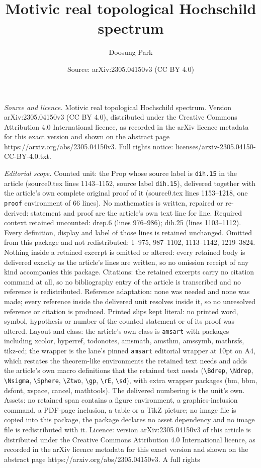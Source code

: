 \documentclass[10pt,a4paper]{amsart}
\title[Motivic real topological Hochschild spectrum]{Motivic real topological Hochschild spectrum}
\author{Doosung Park}
\date{Source: arXiv:2305.04150v3 (CC BY 4.0)}
\begin{document}
\maketitle

\noindent\emph{Source and licence.} Motivic real topological Hochschild spectrum. Version arXiv:2305.04150v3 (CC BY 4.0), distributed under the Creative Commons Attribution 4.0 International licence, as recorded in the arXiv licence metadata for this exact version and shown on the abstract page https://arxiv.org/abs/2305.04150v3. Full rights notice: licenses/arxiv-2305.04150-CC-BY-4.0.txt.\par\smallskip

\noindent\textit{Editorial scope.} Counted unit: the Prop whose source label is \texttt{dih.15} in the article (source0.tex lines 1143--1152, source label \texttt{dih.15}), delivered together with the article's own complete original proof of it (source0.tex lines 1153--1218, one \texttt{proof} environment of 66 lines). No mathematics is written, repaired or re-derived: statement and proof are the article's own text line for line. Required context retained uncounted: drep.6 (lines 976--986); dih.25 (lines 1103--1112). Every definition, display and label of those lines is retained unchanged. Omitted from this package and not redistributed: 1--975, 987--1102, 1113--1142, 1219--3824. Nothing inside a retained excerpt is omitted or altered: every retained body is delivered exactly as the article's lines are written, so no omission receipt of any kind accompanies this package. Citations: the retained excerpts carry no citation command at all, so no bibliography entry of the article is transcribed and no reference is redistributed. Reference adaptation: none was needed and none was made; every reference inside the delivered unit resolves inside it, so no unresolved reference or citation is produced. Printed slips kept literal: no printed word, symbol, hypothesis or number of the counted statement or of its proof was altered. Layout and class: the article's own class is \texttt{amsart} with packages including xcolor, hyperref, todonotes, amsmath, amsthm, amssymb, mathrsfs, tikz-cd; the wrapper is the lane's pinned \texttt{amsart} editorial wrapper at 10pt on A4, which restates the theorem-like environments the retained text needs and adds the article's own macro definitions that the retained text needs (\texttt{\textbackslash Bdrep}, \texttt{\textbackslash Ndrep}, \texttt{\textbackslash Nsigma}, \texttt{\textbackslash Sphere}, \texttt{\textbackslash Ztwo}, \texttt{\textbackslash gp}, \texttt{\textbackslash rE}, \texttt{\textbackslash sd}), with extra wrapper packages (bm, bbm, dsfont, xspace, cancel, mathtools). The delivered numbering is the unit's own. Assets: no retained span contains a figure environment, a graphics-inclusion command, a PDF-page inclusion, a table or a TikZ picture; no image file is copied into this package, the package declares no asset dependency and no image file is redistributed with it. Licence: version arXiv:2305.04150v3 of this article is distributed under the Creative Commons Attribution 4.0 International licence, as recorded in the arXiv licence metadata for this exact version and shown on the abstract page https://arxiv.org/abs/2305.04150v3. A full rights 
\end{document}
